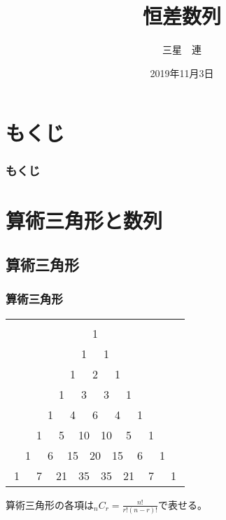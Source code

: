 \documentclass[dvipdfmx,12pt]{beamer}
\title{恒差数列}
\author{三星　連}
\date{2019年11月3日}
\begin{document}
\maketitle

\section*{もくじ}
\begin{frame}
\frametitle{もくじ}    
\tableofcontents
\end{frame}

\section{算術三角形と数列}

\subsection{算術三角形}
\begin{frame}
\frametitle{算術三角形}
\begin{table}
\begin{tabular}{cccccccccccccccc}
&&&&&&&&&&&&&&&\\
\multicolumn{7}{c}{}&\multicolumn{2}{c}{1}&\multicolumn{7}{c}{}\\
\multicolumn{6}{c}{}&\multicolumn{2}{c}{1}&\multicolumn{2}{c}{1}&\multicolumn{6}{c}{}\\
\multicolumn{5}{c}{}&\multicolumn{2}{c}{1}&\multicolumn{2}{c}{2}&\multicolumn{2}{c}{1}&\multicolumn{5}{c}{}\\
\multicolumn{4}{c}{}&\multicolumn{2}{c}{1}&\multicolumn{2}{c}{3}&\multicolumn{2}{c}{3}&\multicolumn{2}{c}{1}&\multicolumn{4}{c}{}\\
\multicolumn{3}{c}{}&\multicolumn{2}{c}{1}&\multicolumn{2}{c}{4}&\multicolumn{2}{c}{6}&\multicolumn{2}{c}{4}&\multicolumn{2}{c}{1}&\multicolumn{3}{c}{}\\
\multicolumn{2}{c}{}&\multicolumn{2}{c}{1}&\multicolumn{2}{c}{5}&\multicolumn{2}{c}{10}&\multicolumn{2}{c}{10}&\multicolumn{2}{c}{5}&\multicolumn{2}{c}{1}&\multicolumn{2}{c}{}\\
&\multicolumn{2}{c}{1}&\multicolumn{2}{c}{6}&\multicolumn{2}{c}{15}&\multicolumn{2}{c}{20}&\multicolumn{2}{c}{15}&\multicolumn{2}{c}{6}&\multicolumn{2}{c}{1}&\\
\multicolumn{2}{c}{1}&\multicolumn{2}{c}{7}&\multicolumn{2}{c}{21}&\multicolumn{2}{c}{35}&\multicolumn{2}{c}{35}&\multicolumn{2}{c}{21}&\multicolumn{2}{c}{7}&\multicolumn{2}{c}{1}
\end{tabular}
\end{table}
算術三角形の各項は$_nC_r=\frac{n!}{r!(n-r)!}$で表せる。
\end{frame}
\end{document}
